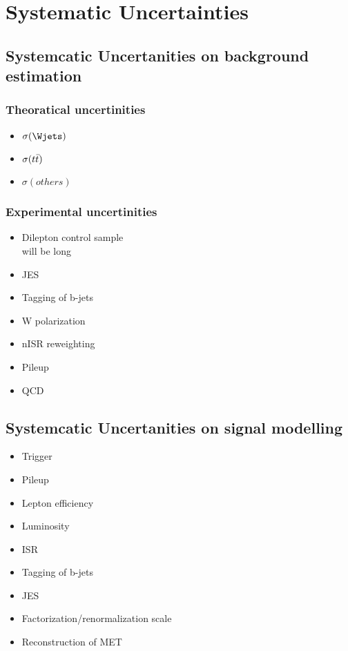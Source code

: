 \chapter{Systematic Uncertainties}
\section{Systemcatic Uncertanities on background estimation}
\subsection{Theoratical uncertinities}
\begin{itemize}
\item $\sigma(\Wjets)$ 
\item $\sigma(t\bar{t})$ 
\item $\sigma(others)$
\newpage
\end{itemize}
\subsection{Experimental uncertinities}
\begin{itemize}
\item Dilepton control sample \\ 
will be long
\newpage
\item JES
\item Tagging of b-jets
\item W polarization  
\item nISR reweighting
\item Pileup 
\item QCD
\end{itemize}
\newpage

\section{Systemcatic Uncertanities on signal modelling}
\begin{itemize}
\item Trigger
\item Pileup
\item Lepton efficiency 
\item Luminosity
\item ISR
\item Tagging of b-jets
\item JES
\item Factorization/renormalization scale
\item Reconstruction of MET 
\end{itemize}
\newpage
